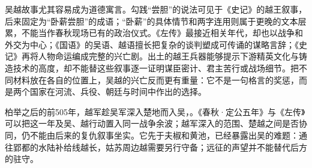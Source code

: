 \begin{sourcenote}
吴越故事尤其容易成为道德寓言。勾践“尝胆”的说法可见于《史记》的越王叙事，后来固定为“卧薪尝胆”的成语；“卧薪”的具体情节和两字连用则属于更晚的文本层累，不能当作春秋现场已有的政治仪式。《左传》最接近相关年代，却也以战争和外交为中心；《国语》的吴语、越语擅长把复杂的谈判塑成可传诵的谋略言辞；《史记》再将人物命运编成完整的兴亡剧。出土的越王兵器能够提示下游精英文化与铸造技术的高度，却不能替这些叙事逐一证明谋臣密计、君主苦行或战场细节。把不同材料放在各自的位置上，吴越的兴亡反而更有重量：它不是一句格言的奖惩，而是两个国家在河流、兵役、朝廷与时间中作出的选择。
\end{sourcenote}


柏举之后的前505年，越军趁吴军深入楚地而入吴，。《春秋·定公五年》与《左传》可以把这一年及吴、越行动置入同一战争余波；越军深入的范围、楚越之间是否协同，仍不能由后来的复仇叙事坐实。它先于夫椒和黄池，已经暴露出吴的难题：通往郢都的水陆补给线越长，姑苏周边越需要另行守备；远征的声望并不能替代后方的驻守。
